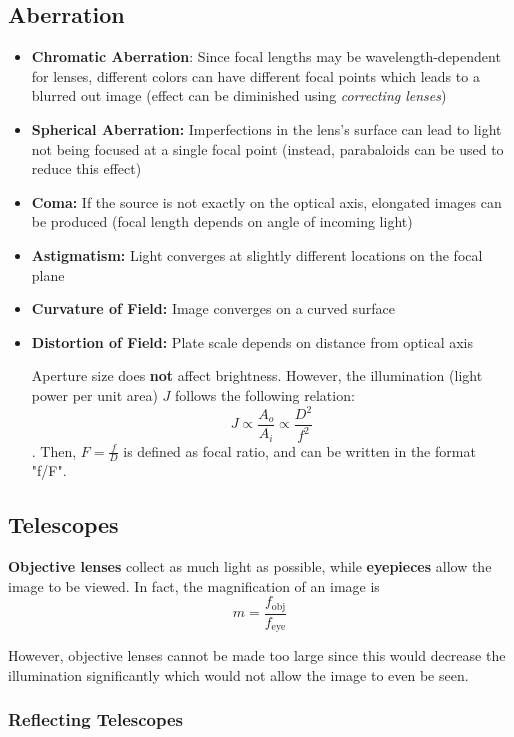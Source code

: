 \documentclass[12pt]{article}
\begin{document}
\subsection{Aberration}
\begin{itemize}
    \item \textbf{Chromatic Aberration}: Since focal lengths may be wavelength-dependent for lenses, different colors can have different focal points which leads to a blurred out image (effect can be diminished using \textit{correcting lenses})
    \item \textbf{Spherical Aberration:} Imperfections in the lens's surface can lead to light not being focused at a single focal point (instead, parabaloids can be used to reduce this effect)
    \item \textbf{Coma:} If the source is not exactly on the optical axis, elongated images can be produced (focal length depends on angle of incoming light)
    \item \textbf{Astigmatism:} Light converges at slightly different locations on the focal plane
    \item \textbf{Curvature of Field:} Image converges on a curved surface
    \item \textbf{Distortion of Field:} Plate scale depends on distance from optical axis
    
    Aperture size does \textbf{not} affect brightness. However, the illumination (light power per unit area) $J$ follows the following relation: $$J \propto \frac{A_o}{A_i} \propto \frac{D^2}{f^2}$$. Then, $F = \frac{f}{D}$ is defined as focal ratio, and can be written in the format "f/{F}".
\end{itemize}

\subsection{Telescopes}

\textbf{Objective lenses} collect as much light as possible, while \textbf{eyepieces} allow the image to be viewed. In fact, the magnification of an image is $$m = \frac{f_{\text{obj}}}{f_{\text{eye}}}$$

However, objective lenses cannot be made too large since this would decrease the illumination significantly which would not allow the image to even be seen.

\subsubsection{Reflecting Telescopes}
\end{document}
